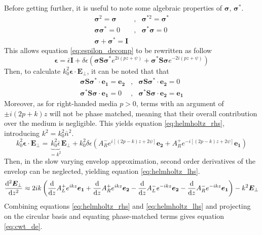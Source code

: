 Before getting further, it is useful to note some algebraic properties of $\bm{\sigma}$, $\bm{\sigma}^*$.
\begin{eqnarray}
	\bm{\sigma}^2 = \bm{\sigma} &,&\bm{\sigma}^{*2} = \bm{\sigma}^* \\
	\bm{\sigma}\bm{\sigma}^* = 0 &,& \bm{\sigma}^*\bm{\sigma} = 0 \\
	\bm{\sigma} + \bm{\sigma}^* = \bm{I}
\end{eqnarray}
This allows equation \ref{eq:espilon_decomp} to be rewritten as follow
\begin{equation}
	\bm{\epsilon} = \bar{\epsilon}\bm{I} + \delta\epsilon\left(\bm{\sigma}\bm{S}\bm{\sigma}^*e^{2i(pz+\psi)} + \bm{\sigma}^*\bm{S}\bm{\sigma}e^{-2i(pz+\psi)}\right) \label{eq:epsilonsigma}
\end{equation}
Then, to calculate $k_0^2\bm{\epsilon}\cdot\bm{E}_\perp$, it can be noted that that
\begin{eqnarray}
	\bm{\sigma}\bm{S}\bm{\sigma}^*\cdot\bm{e_1}=\bm{e_2} &,& \bm{\sigma}\bm{S}\bm{\sigma}^*\cdot\bm{e_2}=0 \\
	\bm{\sigma}^*\bm{S}\bm{\sigma}\cdot\bm{e_1}=0 &,& \bm{\sigma}^*\bm{S}\bm{\sigma}\cdot\bm{e_2}=\bm{e_1}
\end{eqnarray}
Moreover, as for right-handed media $p>0$, terms with an argument of $\pm i(2p+k)z$ will not be phase matched, meaning that their overall contribution over the medium is negligible. This yields equation \ref{eq:helmholtz_rhs}, introducing $k^2=k_0^2\bar{n}^2$.
\begin{equation}
	k_0^2\bm{\epsilon}\cdot\bm{E}_\perp = \underbrace{k_0^2\bar{\epsilon}}_{=k^2}\bm{E}_\perp + k_0^2\delta\epsilon\left(A_R^-e^{i[(2p-k)z+2\psi]}\bm{e_2} + A_R^+e^{-i[(2p-k)z+2\psi]}\bm{e_1}\right)\label{eq:helmholtz_rhs}
\end{equation}
Then, in the slow varying envelop approximation, second order derivatives of the envelop can be neglected, yielding equation \ref{eq:helmholtz_lhs}.
\begin{equation}
	\dv[2]{\bm{E}_\perp}{z} \approx 2ik \left( \dv{z}A_L^+e^{ikz}\bm{e_1} + \dv{z}A_R^+e^{ikz}\bm{e_2} - \dv{z}A_L^-e^{-ikz}\bm{e_2} - \dv{z}A_R^-e^{-ikz}\bm{e_1}\right) - k^2\bm{E}_\perp \label{eq:helmholtz_lhs}
\end{equation}
%
Combining equations \ref{eq:helmholtz_rhs} and \ref{eq:helmholtz_lhs} and projecting on the circular basis and equating phase-matched terms gives equation \ref{eq:cwt_de}.

